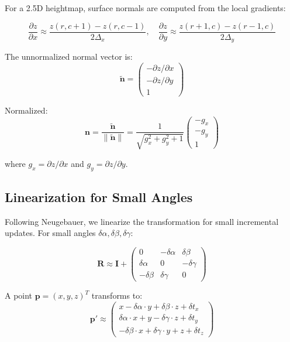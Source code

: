 \documentclass[11pt,a4paper]{article}
\begin{document}
For a 2.5D heightmap, surface normals are computed from the local gradients:

\begin{equation}
\frac{\partial z}{\partial x} \approx \frac{z(r, c+1) - z(r, c-1)}{2 \Delta_x}, \quad
\frac{\partial z}{\partial y} \approx \frac{z(r+1, c) - z(r-1, c)}{2 \Delta_y}
\end{equation}

The unnormalized normal vector is:
\begin{equation}
\tilde{\mathbf{n}} = \begin{pmatrix} -\partial z/\partial x \\ -\partial z/\partial y \\ 1 \end{pmatrix}
\end{equation}

Normalized:
\begin{equation}
\mathbf{n} = \frac{\tilde{\mathbf{n}}}{\|\tilde{\mathbf{n}}\|} = \frac{1}{\sqrt{g_x^2 + g_y^2 + 1}} \begin{pmatrix} -g_x \\ -g_y \\ 1 \end{pmatrix}
\end{equation}

where $g_x = \partial z/\partial x$ and $g_y = \partial z/\partial y$.

\subsection{Linearization for Small Angles}

Following Neugebauer, we linearize the transformation for small incremental updates. For small angles $\delta\alpha, \delta\beta, \delta\gamma$:

\begin{equation}
\mathbf{R} \approx \mathbf{I} + \begin{pmatrix} 0 & -\delta\alpha & \delta\beta \\ \delta\alpha & 0 & -\delta\gamma \\ -\delta\beta & \delta\gamma & 0 \end{pmatrix}
\end{equation}

A point $\mathbf{p} = (x, y, z)^T$ transforms to:
\begin{equation}
\mathbf{p}' \approx \begin{pmatrix}
x - \delta\alpha \cdot y + \delta\beta \cdot z + \delta t_x \\
\delta\alpha \cdot x + y - \delta\gamma \cdot z + \delta t_y \\
-\delta\beta \cdot x + \delta\gamma \cdot y + z + \delta t_z
\end{pmatrix}
\end{equation}
\end{document}
